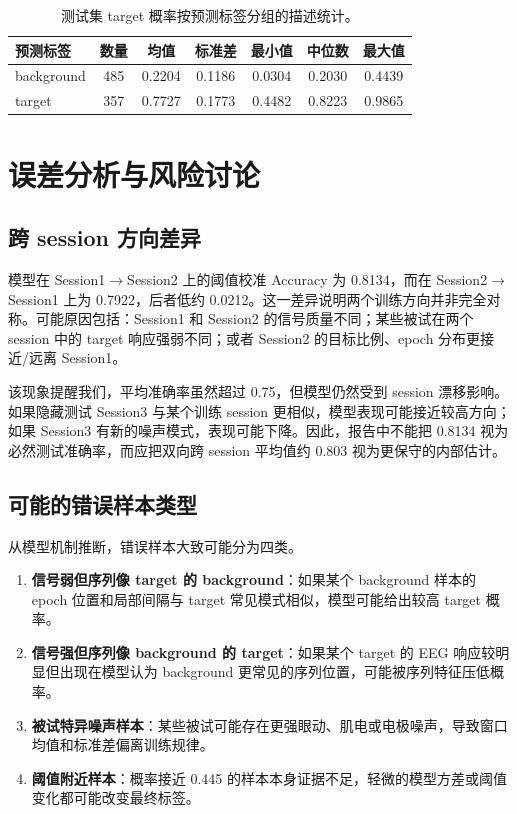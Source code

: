 \begin{table}[htbp]
\centering
\small
\begin{tabular}{lcccccc}
\hline
预测标签 & 数量 & 均值 & 标准差 & 最小值 & 中位数 & 最大值 \\
\hline
background & 485 & 0.2204 & 0.1186 & 0.0304 & 0.2030 & 0.4439 \\
target & 357 & 0.7727 & 0.1773 & 0.4482 & 0.8223 & 0.9865 \\
\hline
\end{tabular}
\caption{测试集 target 概率按预测标签分组的描述统计。}
\end{table}

\chapter{误差分析与风险讨论}

\section{跨 session 方向差异}

模型在 Session1$\rightarrow$Session2 上的阈值校准 Accuracy 为 0.8134，而在 Session2$\rightarrow$Session1 上为 0.7922，后者低约 0.0212。这一差异说明两个训练方向并非完全对称。可能原因包括：Session1 和 Session2 的信号质量不同；某些被试在两个 session 中的 target 响应强弱不同；或者 Session2 的目标比例、epoch 分布更接近/远离 Session1。

该现象提醒我们，平均准确率虽然超过 0.75，但模型仍然受到 session 漂移影响。如果隐藏测试 Session3 与某个训练 session 更相似，模型表现可能接近较高方向；如果 Session3 有新的噪声模式，表现可能下降。因此，报告中不能把 0.8134 视为必然测试准确率，而应把双向跨 session 平均值约 0.803 视为更保守的内部估计。

\section{可能的错误样本类型}

从模型机制推断，错误样本大致可能分为四类。

\begin{enumerate}
  \item \textbf{信号弱但序列像 target 的 background}：如果某个 background 样本的 epoch 位置和局部间隔与 target 常见模式相似，模型可能给出较高 target 概率。
  \item \textbf{信号强但序列像 background 的 target}：如果某个 target 的 EEG 响应较明显但出现在模型认为 background 更常见的序列位置，可能被序列特征压低概率。
  \item \textbf{被试特异噪声样本}：某些被试可能存在更强眼动、肌电或电极噪声，导致窗口均值和标准差偏离训练规律。
  \item \textbf{阈值附近样本}：概率接近 0.445 的样本本身证据不足，轻微的模型方差或阈值变化都可能改变最终标签。
\end{enumerate}


